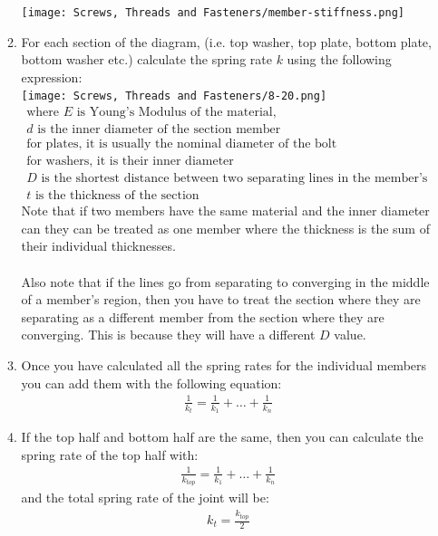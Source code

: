 \documentclass[11pt, fleqn]{article}
\begin{document}
\begin{enumerate}
\begin{enumerate}
        \texttt{[image: Screws, Threads and Fasteners/member-stiffness.png]}
        \item For each section of the diagram, (i.e. top washer, top plate, bottom plate, bottom washer etc.) calculate the spring rate $k$ using the following expression:\\
        \texttt{[image: Screws, Threads and Fasteners/8-20.png]}
        \begin{align*}
            \text{where $E$ is Young's Modulus of the material,}\\
            \text{$d$ is the inner diameter of the section member}\\
            \text{for plates, it is usually the nominal diameter of the bolt}\\
            \text{for washers, it is their inner diameter}\\
            \text{$D$ is the shortest distance between two separating lines in the member's region,}\\
            \text{$t$ is the thickness of the section}
        \end{align*}
        Note that if two members have the same material and the inner diameter can they can be treated as one member where the thickness is the sum of their individual thicknesses.\\
        \\
        Also note that if the lines go from separating to converging in the middle of a member's region, then you have to treat the section where they are separating as a different member from the section where they are converging. This is because they will have a different $D$ value.
        \item Once you have calculated all the spring rates for the individual members you can add them with the following equation:
        \begin{align*}
            \frac{1}{k_t} = \frac{1}{k_1} + \dots + \frac{1}{k_n}
        \end{align*}
        \item If the top half and bottom half are the same, then you can calculate the spring rate of the top half with:
         \begin{align*}
            \frac{1}{k_{top}} = \frac{1}{k_1} + \dots + \frac{1}{k_n}
        \end{align*}
        and the total spring rate of the joint will be:
        \begin{align*}
            k_t = \frac{k_{top}}{2}
        \end{align*}
    \end{enumerate}
\end{enumerate}
\end{document}
